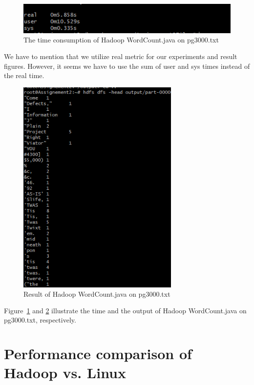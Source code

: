 \documentclass[12pt]{article}
\begin{document}
\begin{figure}[!ht]
    \centering
    \includegraphics[width=140mm, scale=1.0]{images/hadoop-time.png}
    \caption{The time consumption of Hadoop WordCount.java on pg3000.txt}
    \label{fig:fig1}
\end{figure}

\noindent We have to mention that we utilize real metric for our experiments and result figures. However, it seems we have to use the sum of user and sys times instead of the real time.

\begin{figure}[H]
    \centering
    \includegraphics[width=80mm, scale=1.0]{images/output-pg4300.png}
    \caption{Result of Hadoop WordCount.java on pg3000.txt}
    \label{fig:fig2}
\end{figure}

\noindent Figure~\ref{fig:fig1} and \ref{fig:fig2} illustrate the time and the output of Hadoop WordCount.java on pg3000.txt, respectively.

\newpage

\section{Performance comparison of Hadoop vs. Linux}
\end{document}
